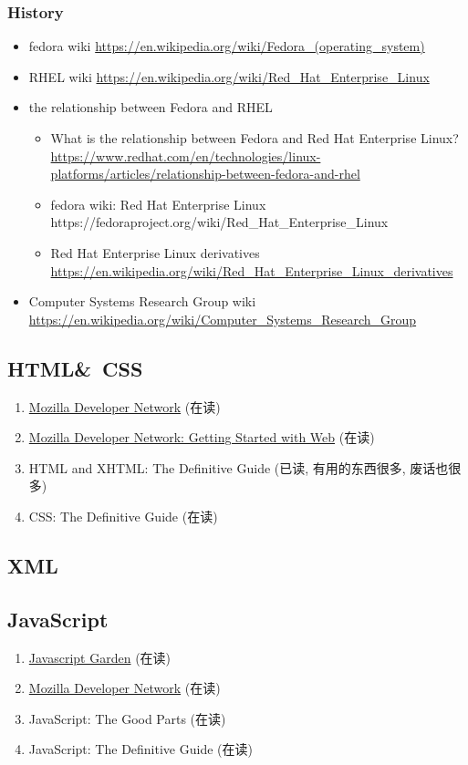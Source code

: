 \documentclass{article}
\begin{document}
\subsubsection{History}
%
\begin{itemize}
    \item fedora wiki \url{https://en.wikipedia.org/wiki/Fedora_(operating_system)}
    \item RHEL wiki \url{https://en.wikipedia.org/wiki/Red_Hat_Enterprise_Linux}
    \item the relationship between Fedora and RHEL
        \begin{itemize}
            \item What is the relationship between Fedora and Red Hat Enterprise Linux? \url{https://www.redhat.com/en/technologies/linux-platforms/articles/relationship-between-fedora-and-rhel}
            \item fedora wiki: Red Hat Enterprise Linux {https://fedoraproject.org/wiki/Red_Hat_Enterprise_Linux}
            \item Red Hat Enterprise Linux derivatives \url{https://en.wikipedia.org/wiki/Red_Hat_Enterprise_Linux_derivatives}
        \end{itemize}
    \item Computer Systems Research Group wiki \url{https://en.wikipedia.org/wiki/Computer_Systems_Research_Group}
\end{itemize}
\subsection{HTML\&\ CSS}
\begin{enumerate}
    \item \href{https://developer.mozilla.org/en-US/Learn}{Mozilla Developer Network} (在读)
    \item \href{https://developer.mozilla.org/en-US/Learn/Getting_started_with_the_web}{Mozilla Developer Network: Getting Started with Web} (在读)
    \item HTML and XHTML: The Definitive Guide (已读, 有用的东西很多, 废话也很多)
    \item CSS: The Definitive Guide (在读)
\end{enumerate}
%
\subsection{XML}
%
\subsection{JavaScript}
\begin{enumerate}
    \item  \href{http://bonsaiden.github.io/JavaScript-Garden/}{Javascript Garden} (在读)
    \item \href{https://developer.mozilla.org/en-US/Learn}{Mozilla Developer Network} (在读)
    \item JavaScript: The Good Parts (在读)
    \item JavaScript: The Definitive Guide (在读)
\end{enumerate}
\end{document}
